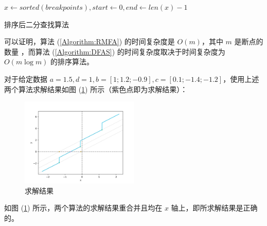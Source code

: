 \begin{algorithm}[H]
  \SetStartEndCondition{ }{}{}
  \AlgoDontDisplayBlockMarkers\SetAlgoNoEnd\SetAlgoNoLine

  $x\longleftarrow sorted(breakpoints),start\longleftarrow 0,end\longleftarrow len(x)-1$\;
  \caption{排序后二分查找算法}\label{Algorithm:DFAS}
\end{algorithm}

可以证明，算法 (\ref{Algorithm:RMFA}) 的时间复杂度是 $O(m)$，其中 $m$ 是断点的数量 \cite{10.1016/j.patcog.2017.02.006}，而算法 (\ref{Algorithm:DFAS}) 的时间复杂度取决于时间复杂度为 $O(m\log{m})$ 的排序算法。

对于给定数据 $a=1.5,d=1,b=[1;1.2;−0.9],c=[0.1;−1.4;−1.2]$，使用上述两个算法求解结果如图 (\ref{Answer}) 所示（紫色点即为求解结果）：

\begin{figure}[htb]
  \centering
  \includegraphics[width=0.5\textwidth]{figures/Answer.png}
  \caption{求解结果}
  \label{Answer}
\end{figure}

如图 (\ref{Answer}) 所示，两个算法的求解结果重合并且均在 $x$ 轴上，即所求解结果是正确的。